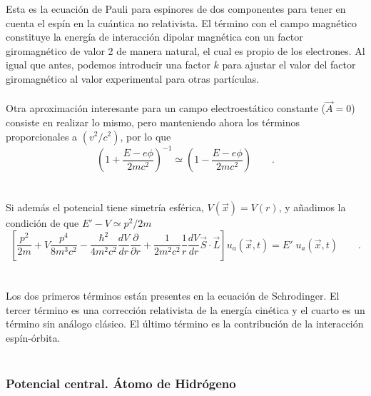 \documentclass[11pt,letterpaper]{article}     %
\begin{document}
Esta es la ecuación de Pauli para espinores de dos componentes para tener en cuenta el espín en la cuántica no relativista. El término con el campo magnético constituye la energía de interacción dipolar magnética con un factor giromagnético de valor 2 de manera natural, el cual es propio de los electrones. Al igual que antes, podemos introducir una factor $k$ para ajustar el valor del factor giromagnético al valor experimental para otras partículas. \\ \\
Otra aproximación interesante para un campo electroestático constante ($\vec{A}=0$) consiste en realizar lo mismo, pero manteniendo ahora los términos proporcionales a $(v^2/c^2)$, por lo que 
\begin{equation} \label{eq:77}
\left(1 + \frac{E-e\phi}{2mc^2}\right)^{-1} \simeq \left(1 - \frac{E-e\phi}{2mc^2}\right) \qquad .
\end{equation} \\ \\
Si además el potencial tiene simetría esférica, $V(\vec{x})=V(r)$, y añadimos la condición de que $E'-V \simeq p^2/2m$
\begin{equation} \label{eq:78}
\left[\frac{p^2}{2m} + V \frac{p^4}{8m^3c^2} - \frac{\hbar^2}{4m^2c^2}\frac{d V}{dr}\frac{\partial}{\partial r}+ \frac{1}{2m^2c^2}\frac{1}{r} \frac{dV}{dr} \vec{S} \cdot \vec{L}\right] u_a(\vec{x},t)=E' \; u_a(\vec{x},t) \qquad .
\end{equation} \\ \\
Los dos primeros términos están presentes en la ecuación de Schrodinger. El tercer término es una corrección relativista de la energía cinética y el cuarto es un término sin análogo clásico. El último término es la contribución de la interacción espín-órbita. \\ \\






\subsubsection{Potencial central. Átomo de Hidrógeno}    %
\end{document}
